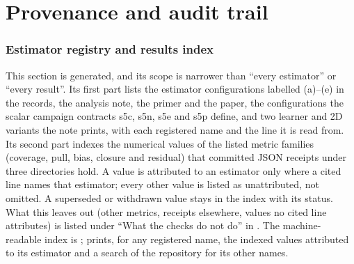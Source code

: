 \documentclass[11pt]{article}
\begin{document}
\part{Provenance and audit trail}
\begingroup
{}

\endgroup






\section{Estimator registry and results index}
\label{sec:rix}
This section is generated, and its scope is narrower than ``every estimator'' or ``every result''. Its first part
lists the estimator configurations labelled (a)--(e) in the records, the analysis note, the primer and the paper,
the configurations the scalar campaign contracts s5c, s5n, s5e and s5p define, and two learner and 2D variants the
note prints, with each registered name and the line it is read from. Its second part indexes the numerical values
of the listed metric families (coverage, pull, bias, closure and residual) that committed JSON receipts under three
directories hold. A value is attributed to an estimator only where a cited line names that estimator; every other
value is listed as unattributed, not omitted. A superseded or withdrawn value stays in the index with its status. What
this leaves out (other metrics, receipts elsewhere, values no cited line attributes) is listed under ``What the checks
do not do'' in . The machine-readable index is
;  prints, for any
registered name, the indexed values attributed to its estimator and a search of the repository for its other names.
\end{document}
